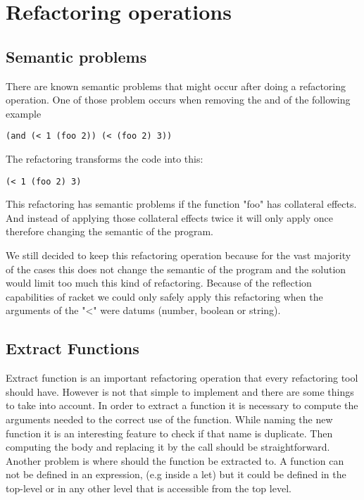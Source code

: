 \section{Refactoring operations}

\subsection{Semantic problems}
There are known semantic problems that might occur after doing a refactoring
operation.
One of those problem occurs when removing the and of the following example
\begin{lstlisting}[basicstyle=\ttfamily, caption="Example"]
  (and (< 1 (foo 2)) (< (foo 2) 3))
\end{lstlisting}
The refactoring transforms the code into this:
\begin{lstlisting}[basicstyle=\ttfamily, caption="Example"]
  (< 1 (foo 2) 3)
\end{lstlisting}

This refactoring has semantic problems if the function "foo" has collateral effects.
And instead of applying those collateral effects twice it will only apply once therefore
changing the semantic of the program.

We still decided to keep this refactoring operation because for the vast majority
of the cases this does not change the semantic of the program and the solution
would limit too much this kind of refactoring. Because of the reflection capabilities
of racket we could only safely apply this refactoring when the arguments of the
"<" were datums (number, boolean or string).

\subsection{Extract Functions}
Extract function is an important refactoring operation that every refactoring tool
should have. However is not that simple to implement and there are some things to
take into account.
In order to extract a function it is necessary to compute the arguments needed
to the correct use of the function. While naming the new function it is an interesting
feature to check if that name is duplicate.
Then computing the body and replacing it by the call should be straightforward.
Another problem is where should the function be extracted to. A function can not
be defined in an expression, (e.g inside a let) but it could be defined in the top-level
or in any other level that is accessible from the top level.

